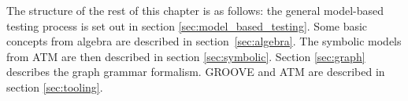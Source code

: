 The structure of the rest of this chapter is as follows: the general model-based testing process is set out in section \ref{sec:model_based_testing}. Some basic concepts from algebra are described in section~\ref{sec:algebra}. The symbolic models from ATM are then described in section \ref{sec:symbolic}. Section \ref{sec:graph} describes the graph grammar formalism. GROOVE and ATM are described in section \ref{sec:tooling}.
